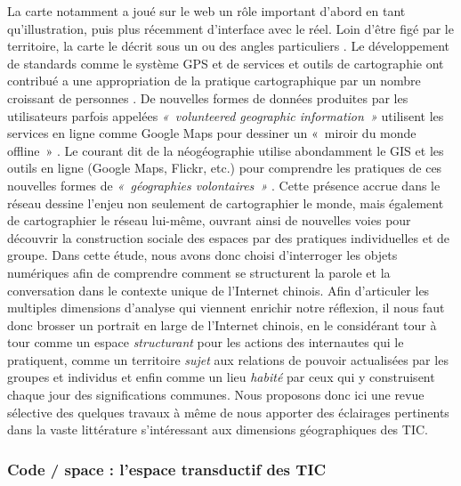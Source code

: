 La carte notamment a joué sur le web un rôle important d’abord en tant qu’illustration, puis plus récemment d’interface avec le réel. Loin d’être figé par le territoire, la carte le décrit sous un ou des angles particuliers \citep{Brunet1987, Jacob1992}. Le développement de standards comme le système GPS \citep{Haklay2008} et de services et outils de cartographie ont contribué a une appropriation de la pratique cartographique par un nombre croissant de personnes \citep{Crampton2008}. De nouvelles formes de données produites par les utilisateurs parfois appelées \textit{« volunteered geographic information »} \citep{Elwood2008} utilisent les services en ligne comme Google Maps pour dessiner un « miroir du monde offline » \citep{Graham2011}. Le courant dit de la néogéographie utilise abondamment le GIS et les outils en ligne (Google Maps, Flickr, etc.) pour comprendre les pratiques de ces nouvelles formes de \textit{« géographies volontaires »} \citep{Turner2006}. Cette présence accrue dans le réseau dessine l’enjeu non seulement de cartographier le monde, mais également de cartographier le réseau lui-même, ouvrant ainsi de nouvelles voies pour découvrir la construction sociale des espaces par des pratiques individuelles et de groupe. Dans cette étude, nous avons donc choisi d’interroger les objets numériques afin de comprendre comment se structurent la parole et la conversation dans le contexte unique de l’Internet chinois. Afin d’articuler les multiples dimensions d’analyse qui viennent enrichir notre réflexion, il nous faut donc brosser un portrait en large de l’Internet chinois, en le considérant tour à tour comme un espace \textit{structurant} pour les actions des internautes qui le pratiquent, comme un territoire \textit{sujet} aux relations de pouvoir actualisées par les groupes et individus et enfin comme un lieu \textit{habité} par ceux qui y construisent chaque jour des significations communes. Nous proposons donc ici une revue sélective des quelques travaux à même de nous apporter des éclairages pertinents dans la vaste littérature s’intéressant aux dimensions géographiques des TIC.

\subsubsection[Code / space : l’espace transductif des TIC]{Code / space : l’espace transductif des TIC}

